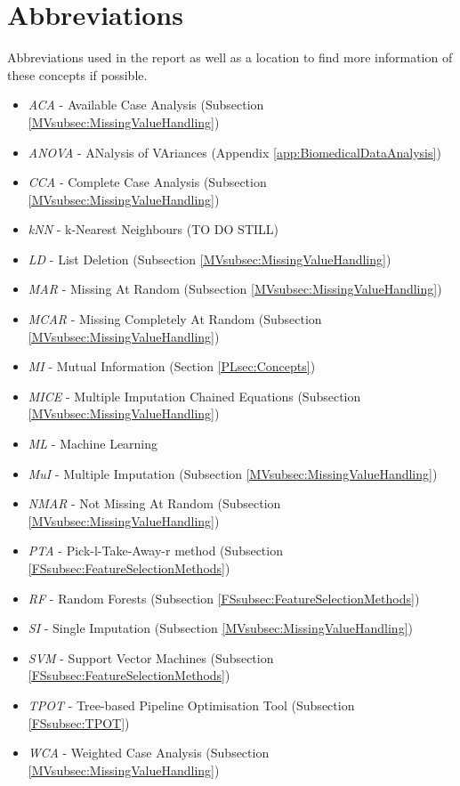 \documentclass[10pt,a4paper]{report}
\begin{document}
	 
	
	
	\appendix
	
	\chapter{Abbreviations}
	\label{PLsec:Abbreviations}
	
	Abbreviations used in the report as well as a location to find more information of these concepts if possible.
	
	\begin{itemize}
		\item \textit{ACA} - Available Case Analysis (Subsection \ref{MVsubsec:MissingValueHandling})
		\item \textit{ANOVA} - ANalysis of VAriances (Appendix \ref{app:BiomedicalDataAnalysis})
		\item \textit{CCA} - Complete Case Analysis (Subsection \ref{MVsubsec:MissingValueHandling})
		\item \textit{kNN} - k-Nearest Neighbours (TO DO STILL)
		\item \textit{LD} - List Deletion (Subsection \ref{MVsubsec:MissingValueHandling})
		\item \textit{MAR} - Missing At Random (Subsection \ref{MVsubsec:MissingValueHandling})
		\item \textit{MCAR} - Missing Completely At Random (Subsection \ref{MVsubsec:MissingValueHandling})
		\item \textit{MI} - Mutual Information (Section \ref{PLsec:Concepts})
		\item \textit{MICE} - Multiple Imputation Chained Equations (Subsection \ref{MVsubsec:MissingValueHandling})
		\item \textit{ML} - Machine Learning 
		\item \textit{MuI} - Multiple Imputation (Subsection \ref{MVsubsec:MissingValueHandling})
		\item \textit{NMAR} - Not Missing At Random (Subsection \ref{MVsubsec:MissingValueHandling})
		\item \textit{PTA} - Pick-l-Take-Away-r method (Subsection \ref{FSsubsec:FeatureSelectionMethods})
		\item \textit{RF} - Random Forests (Subsection \ref{FSsubsec:FeatureSelectionMethods})
		\item \textit{SI} - Single Imputation (Subsection \ref{MVsubsec:MissingValueHandling})
		\item \textit{SVM} - Support Vector Machines (Subsection \ref{FSsubsec:FeatureSelectionMethods})
		\item \textit{TPOT} - Tree-based Pipeline Optimisation Tool (Subsection \ref{FSsubsec:TPOT})
		\item \textit{WCA} - Weighted Case Analysis (Subsection \ref{MVsubsec:MissingValueHandling})
	\end{itemize}
	
\end{document}
